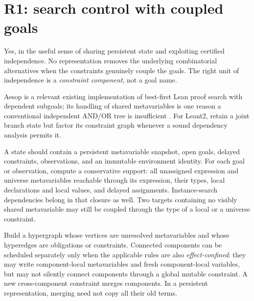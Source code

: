 \section{R1: search control with coupled goals}
\label{sec:search}

\ans Yes, in the useful sense of sharing persistent state and exploiting certified independence. No representation removes the underlying combinatorial alternatives when the constraints genuinely couple the goals. The right unit of independence is a \emph{constraint component}, not a goal name.

Aesop is a relevant existing implementation of best-first Lean proof search with dependent subgoals; its handling of shared metavariables is one reason a conventional independent AND/OR tree is insufficient \cite{aesop}. For Leant2, retain a joint branch state but factor its constraint graph whenever a sound dependency analysis permits it.

A state should contain a persistent metavariable snapshot, open goals, delayed constraints, observations, and an immutable environment identity. For each goal or observation, compute a conservative support: all unassigned expression and universe metavariables reachable through its expression, their types, local declarations and local values, and delayed assignments. Instance-search dependencies belong in that closure as well. Two targets containing no visibly shared metavariable may still be coupled through the type of a local or a universe constraint.

Build a hypergraph whose vertices are unresolved metavariables and whose hyperedges are obligations or constraints. Connected components can be scheduled separately only when the applicable rules are also \emph{effect-confined}: they may write component-local metavariables and fresh component-local variables, but may not silently connect components through a global mutable constraint. A new cross-component constraint merges components. In a persistent representation, merging need not copy all their old terms.

